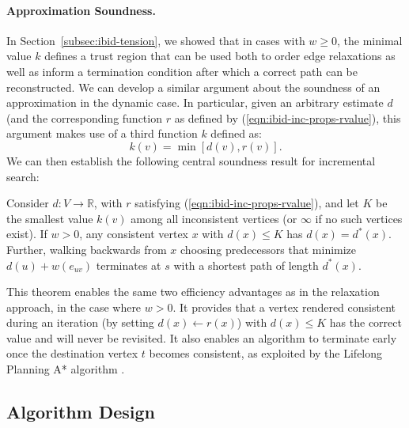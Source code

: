 \paragraph{Approximation Soundness.}
In Section~\ref{subsec:ibid-tension},
we showed that in cases with $w \geq 0$,
the minimal value $k$ defines a trust region that can be used both
to order edge relaxations as well as inform a termination condition
after which a correct path can be reconstructed.
We can develop a similar argument about the soundness of an
approximation in the dynamic case.
In particular,
given an arbitrary estimate $d$
(and the corresponding function $r$ as defined by
(\ref{eqn:ibid-inc-props-rvalue}),
this argument makes use of a third function $k$ defined as:
\begin{equation}
   k(v) = \min\left[ d(v), r(v) \right].
\end{equation}
We can then establish the following central soundness result
for incremental search:

\begin{theorem}
Consider $d: V \rightarrow \mathbb{R}$,
with $r$ satisfying (\ref{eqn:ibid-inc-props-rvalue}),
and let $K$ be the smallest value $k(v)$
among all inconsistent vertices
(or $\infty$ if no such vertices exist).
If $w > 0$,
any consistent vertex $x$ with $d(x) \leq K$
has $d(x) = d^*(x)$.
Further,
walking backwards from $x$ choosing predecessors that minimize
$d(u) + w(e_{uv})$ terminates at $s$ with a shortest path
of length $d^*(x)$.
\label{thm:ibid-dynamicswsffp-sound}
\end{theorem}

This theorem enables the same two efficiency advantages as in
the relaxation approach, in the case where $w > 0$.
It provides that a vertex rendered consistent during an iteration
(by setting $d(x) \leftarrow r(x)$) with $d(x) \leq K$
has the correct value and will never be revisited.
It also enables an algorithm to terminate early
once the destination vertex $t$ becomes consistent,
as exploited by the Lifelong Planning A* algorithm
\citep{koenig2004lpastar}.

\subsection{Algorithm Design}

